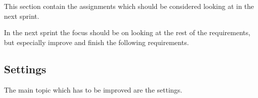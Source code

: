 This section contain the assignments which should be considered looking at in the next sprint.

In the next sprint the focus should be on looking at the rest of the requirements, but especially improve and finish the following requirements.

\subsection{Settings}
The main topic which has to be improved are the settings.